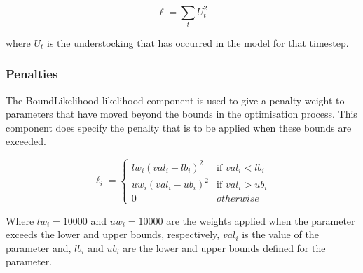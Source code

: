 \documentclass[review]{elsarticle}
\begin{document}
\begin{equation}
\label{eq:under}
\ell=\sum\limits_t  U_{t}^{2}
\end{equation}

where $U_{t}$ is the understocking that has occurred in the model for that timestep.

\subsubsection*{Penalties}
The BoundLikelihood likelihood component is used to give a penalty weight to parameters that have moved beyond the bounds in the optimisation process. This component does specify the penalty that is to be applied when these bounds are exceeded.


\begin{equation*}
\ell_i= \begin {cases}
lw_i(val_i - lb_i)^{2} &\text{if $val_i < lb_i$} \\
uw_i(val_i - ub_i)^{2} & \text{if $val_i > ub_i$} \\
0 & otherwise
\end{cases}
\end{equation*}

Where $lw_i=10000$ and $uw_i=10000$ are the weights applied when the parameter exceeds the lower and upper bounds, respectively, $val_i$ is the value of the parameter and, $lb_i$ and $ub_{i}$ are the lower and upper bounds defined for the parameter.
\end{document}
